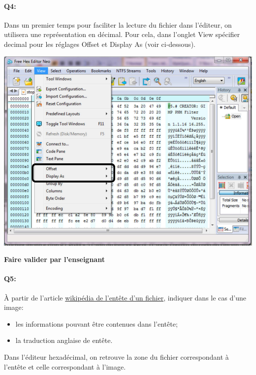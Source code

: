 \documentclass{article}
\begin{document}
\paragraph{Q4:}
Dans un premier temps pour faciliter la lecture du fichier dans l'éditeur, on utilisera une représentation en décimal. 
Pour cela, dans l'onglet \og{}View\fg{} spécifier \og{}decimal\fg{} pour les réglages \og{}Offset\fg{} et \og{}Display As\fg{} (voir ci-dessous).

\begin{center}
	\includegraphics[width=.6\linewidth]{./figures/config_decimal.png}
\end{center}

\begin{center}
	\vspace{2em}
	\Large
	\textbf{Faire valider par l'enseignant}
\end{center}

\newpage

\paragraph{Q5:}
À partir de l'article \href{https://fr.wikipedia.org/wiki/Header}{wikipédia de l'entête d’un fichier}, indiquer dans le cas d'une image:
\begin{itemize}
	\item les informations pouvant être contenues dans l'entête;
	\item la traduction anglaise de \og{}entête\fg{}.
\end{itemize}

\vspace{1em}
\begin{Form}
	\TextField[name=r5,width=\linewidth,height=5em,multiline=true]{}
\end{Form}

Dans l'éditeur hexadécimal, on retrouve la zone du fichier correspondant à l'entête et celle correspondant à l'image.\\
\end{document}
